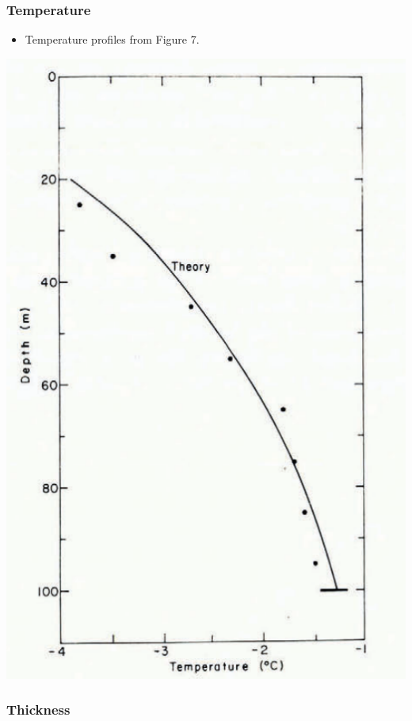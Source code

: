 \documentclass[article,a4paper,times,11pt,twoside]{article}
\begin{document}
\subsubsection{Temperature}
\label{sec:orgaccc82d}

\begin{itemize}
\item Temperature profiles from \textcite{colbeck_1979} Figure 7.
\end{itemize}

\begin{center}
\includegraphics[width=.9\linewidth]{isua_12/isua_12.png}
\end{center}

\subsubsection{Thickness}
\label{sec:orgaacd8f3}
\end{document}

